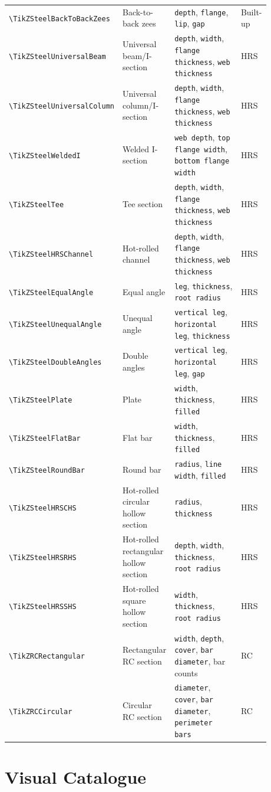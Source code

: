\documentclass[10pt]{article}
\newcommand{\smallcommand}[1]{{\scriptsize\texttt{\textbackslash #1}}}
\newcommand{\keyname}[1]{\texttt{#1}}
\newcommand{\CommandSummary}[4]{%
  \smallcommand{#1} & #2 & #3 & #4 \\
}
\begin{document}
\begin{footnotesize}
\begin{longtable}{@{}L{0.32\linewidth}L{0.19\linewidth}L{0.32\linewidth}L{0.05\linewidth}@{}}
\CommandSummary{TikZSteelBackToBackZees}{Back-to-back zees}{\keyname{depth}, \keyname{flange}, \keyname{lip}, \keyname{gap}}{Built-up}
\CommandSummary{TikZSteelUniversalBeam}{Universal beam/I-section}{\keyname{depth}, \keyname{width}, \keyname{flange thickness}, \keyname{web thickness}}{HRS}
\CommandSummary{TikZSteelUniversalColumn}{Universal column/I-section}{\keyname{depth}, \keyname{width}, \keyname{flange thickness}, \keyname{web thickness}}{HRS}
\CommandSummary{TikZSteelWeldedI}{Welded I-section}{\keyname{web depth}, \keyname{top flange width}, \keyname{bottom flange width}}{HRS}
\CommandSummary{TikZSteelTee}{Tee section}{\keyname{depth}, \keyname{width}, \keyname{flange thickness}, \keyname{web thickness}}{HRS}
\CommandSummary{TikZSteelHRSChannel}{Hot-rolled channel}{\keyname{depth}, \keyname{width}, \keyname{flange thickness}, \keyname{web thickness}}{HRS}
\CommandSummary{TikZSteelEqualAngle}{Equal angle}{\keyname{leg}, \keyname{thickness}, \keyname{root radius}}{HRS}
\CommandSummary{TikZSteelUnequalAngle}{Unequal angle}{\keyname{vertical leg}, \keyname{horizontal leg}, \keyname{thickness}}{HRS}
\CommandSummary{TikZSteelDoubleAngles}{Double angles}{\keyname{vertical leg}, \keyname{horizontal leg}, \keyname{gap}}{HRS}
\CommandSummary{TikZSteelPlate}{Plate}{\keyname{width}, \keyname{thickness}, \keyname{filled}}{HRS}
\CommandSummary{TikZSteelFlatBar}{Flat bar}{\keyname{width}, \keyname{thickness}, \keyname{filled}}{HRS}
\CommandSummary{TikZSteelRoundBar}{Round bar}{\keyname{radius}, \keyname{line width}, \keyname{filled}}{HRS}
\CommandSummary{TikZSteelHRSCHS}{Hot-rolled circular hollow section}{\keyname{radius}, \keyname{thickness}}{HRS}
\CommandSummary{TikZSteelHRSRHS}{Hot-rolled rectangular hollow section}{\keyname{depth}, \keyname{width}, \keyname{thickness}, \keyname{root radius}}{HRS}
\CommandSummary{TikZSteelHRSSHS}{Hot-rolled square hollow section}{\keyname{width}, \keyname{thickness}, \keyname{root radius}}{HRS}
\CommandSummary{TikZRCRectangular}{Rectangular RC section}{\keyname{width}, \keyname{depth}, \keyname{cover}, \keyname{bar diameter}, bar counts}{RC}
\CommandSummary{TikZRCCircular}{Circular RC section}{\keyname{diameter}, \keyname{cover}, \keyname{bar diameter}, \keyname{perimeter bars}}{RC}
\bottomrule
\end{longtable}
\end{footnotesize}

\section{Visual Catalogue}
\end{document}
